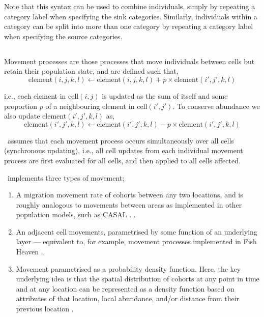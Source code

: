 Note that this syntax can be used to combine individuals, simply by repeating a category label when specifying the sink categories. Similarly, individuals within a category can be split into more than one category by repeating a category label when specifying the source categories.

\subsection{}

Movement processes are those processes that move individuals between cells but retain their population state, and are defined such that,
\begin{equation}
\text{element}(i,j,k,l)\leftarrow \text{element}(i,j,k,l) + p \times \text{element}(i',j',k,l)
\end{equation}

i.e., each element in cell$(i,j)$ is updated as the sum of itself and some proportion $p$ of a neighbouring element in cell$(i',j')$. To conserve abundance we also update element$(i',j',k,l)$ as,
\begin{equation}
\text{element}(i',j',k,l)\leftarrow \text{element}(i',j',k,l) - p\times \text{element}(i',j',k,l)
\end{equation}

\SPM\ assumes that each movement process occurs simultaneously over all cells (synchronous updating), i.e., all cell updates from each individual movement process are first evaluated for all cells, and then applied to all cells affected. 

\SPM\ implements three types of movement;
\begin{enumerate}
	\item  A migration movement rate of cohorts between any two locations, and is roughly analogous to movements between areas as implemented in other population models, such as CASAL \citep{1388}. \NYI.
	\item An adjacent cell movements, parametrised by some function of an underlying layer --- equivalent to, for example, movement processes implemented in Fish Heaven \citep{1136,1135}. \NYI
	\item Movement parametrised as a probability density function. Here, the key underlying idea is that the spatial distribution of cohorts at any point in time and at any location can be represented as a density function based on attributes of that location, local abundance, and/or distance from their previous location \citep{1366,1367}. 
\end{enumerate}

